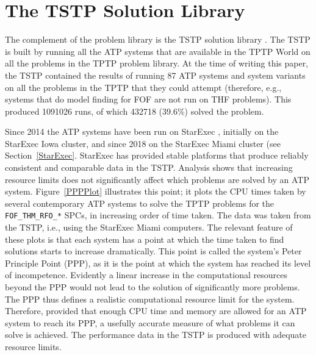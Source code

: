 \documentclass{easychair}
\begin{document}
\section{The TSTP Solution Library}
\label{TSTP}

The complement of the problem library is the TSTP solution library \cite{Sut07-CSR,Sut10}.
The TSTP is built by running all the ATP systems that are available in the TPTP World on
all the problems in the TPTP problem library.
At the time of writing this paper, the TSTP contained the results of running 87 ATP systems and 
system variants on all the problems in the TPTP that they could attempt
(therefore, e.g., systems that do model finding for FOF are not run on THF problems).
This produced 1091026 runs, of which 432718 (39.6\%) solved the problem.

Since 2014 the ATP systems have been run on StarExec \cite{SST14}, initially on the StarExec
Iowa cluster, and since 2018 on the StarExec Miami cluster (see Section~\ref{StarExec}.
StarExec has provided stable platforms that produce reliably consistent and comparable data in
the TSTP.
Analysis shows that increasing resource limits does not significantly affect which problems 
are solved by an ATP system. 
Figure~\ref{PPPPlot} illustrates this point; it plots the CPU times taken by several contemporary 
ATP systems to solve the TPTP problems for the {\tt FOF\_THM\_RFO\_*} SPCs, in increasing order 
of time taken. 
The data was taken from the TSTP, i.e., using the StarExec Miami computers.
The relevant feature of these plots is that each system has a point at which the time taken to 
find solutions starts to increase dramatically. 
This point is called the system's Peter Principle \cite{PH69} Point (PPP), as it is the point at 
which the system has reached its level of incompetence. 
Evidently a linear increase in the computational resources beyond the PPP would not lead to the 
solution of significantly more problems. 
The PPP thus defines a realistic computational resource limit for the system. 
Therefore, provided that enough CPU time and memory are allowed for an ATP system to reach its 
PPP, a usefully accurate measure of what problems it can solve is achieved.
The performance data in the TSTP is produced with adequate resource limits.
\end{document}

